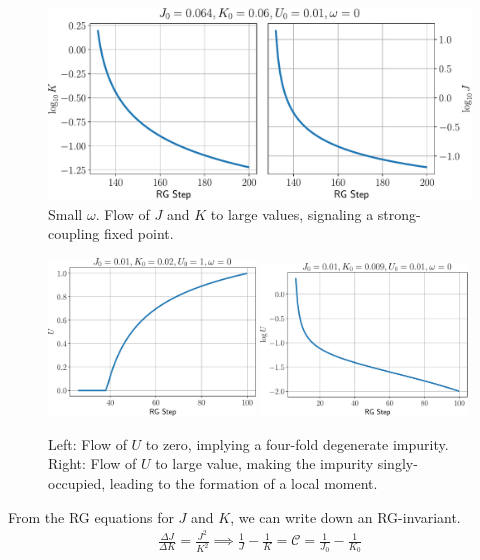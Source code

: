 \documentclass[twoside,11pt]{report}
\numberwithin{equation}{section}
\begin{document}
\begin{figure}[htpb!]
	\centering
	\includegraphics[width=\textwidth]{../figures/low_w_JK.pdf}
	\caption{Small \(\omega\). Flow of \(J\) and \(K\) to large values, signaling a strong-coupling fixed point.}
	\label{J_sc}
\end{figure}
\begin{figure}[htpb]
	\centering
	\includegraphics[width=0.49\textwidth]{../figures/U_irr.pdf}
	\includegraphics[width=0.49\textwidth]{../figures/U_rel.pdf}
	\caption{Left: Flow of \(U\) to zero, implying a four-fold degenerate impurity. Right: Flow of \(U\) to large value, making the impurity singly-occupied, leading to the formation of a local moment.}
	\label{U_flow}
\end{figure}
From the RG equations for \(J\) and \(K\), we can write down an RG-invariant.
\begin{equation}\begin{aligned}
	\label{rginv}
	\frac{\Delta J}{\Delta K} = \frac{J^2}{K^2} \implies \frac{1}{J} - \frac{1}{K} = \mathcal{C} = \frac{1}{J_0} - \frac{1}{K_0}
\end{aligned}\end{equation}
\end{document}
